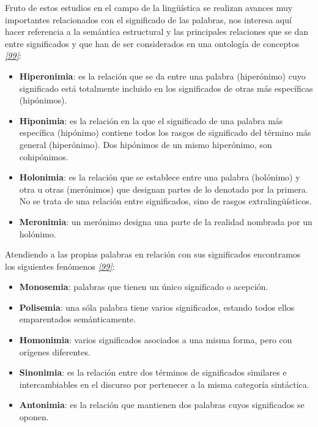 \documentclass[a4paper,12pt,spanish]{book}
\begin{document}
Fruto de estos estudios en el campo de la lingüística se realizan avances muy importantes
relacionados con el significado de las palabras, nos interesa aquí hacer referencia a la
semántica estructural y las principales relaciones que se dan entre significados y que
han de ser considerados en una ontología de conceptos \label{1.state-of-the-art/i.representacion-conocimiento:id25}{\hyperref[zreferences:wpsemantica]{\emph{{[}99{]}}}}:
\begin{itemize}
\item {} 
\textbf{Hiperonimia}: es la relación que se da entre una palabra (hiperónimo) cuyo significado
está totalmente incluido en los significados de otras más específicas (hipónimos).

\item {} 
\textbf{Hiponimia}: es la relación en la que el significado de una palabra más específica
(hipónimo) contiene todos los rasgos de significado del término más general (hiperónimo).
Dos hipónimos de un mismo hiperónimo, son cohipónimos.

\item {} 
\textbf{Holonimia}: es la relación que se establece entre una palabra (holónimo) y otra u
otras (merónimos) que designan partes de lo denotado por la primera. No se trata de una
relación entre significados, sino de rasgos extralingüísticos.

\item {} 
\textbf{Meronimia}: un merónimo designa una parte de la realidad nombrada por un holónimo.

\end{itemize}

Atendiendo a las propias palabras en relación con sus significados encontramos los siguientes
fenómenos \label{1.state-of-the-art/i.representacion-conocimiento:id26}{\hyperref[zreferences:wpsemantica]{\emph{{[}99{]}}}}:
\begin{itemize}
\item {} 
\textbf{Monosemia}: palabras que tienen un único significado o acepción.

\item {} 
\textbf{Polisemia}: una sóla palabra tiene varios significados, estando todos ellos emparentados
semánticamente.

\item {} 
\textbf{Homonimia}: varios significados asociados a una misma forma, pero con orígenes diferentes.

\item {} 
\textbf{Sinonimia}: es la relación entre dos términos de significados similares e intercambiables
en el discurso por pertenecer a la misma categoría sintáctica.

\item {} 
\textbf{Antonimia}: es la relación que mantienen dos palabras cuyos significados se oponen.

\end{itemize}
\end{document}
